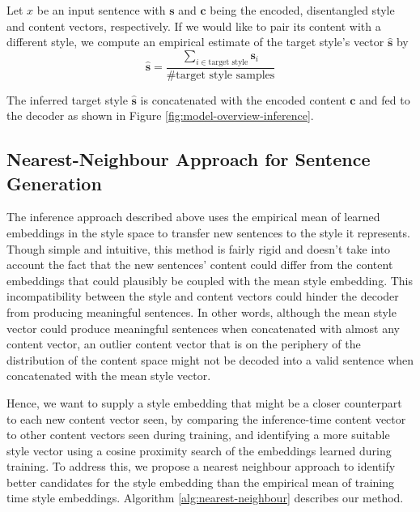 Let $x$ be an input sentence with $\bm s$ and $\bm c$ being the encoded, disentangled style and content vectors, respectively. If we would like to pair its content with a different style, we compute an empirical estimate of the target style's vector $\hat{\bm s}$ by
\begin{equation*}
	\hat{\bm s}=\frac{\sum_{i\in\text{target style}}\bm s_i}{\text{\# target style samples}}
\end{equation*}

The inferred target style $\hat{\bm s}$ is concatenated with the encoded content $\bm c$ and fed to the decoder as shown in Figure \ref{fig:model-overview-inference}.


\subsection{Nearest-Neighbour Approach for Sentence Generation} \label{ssec:nearest-neighbour-inference}

The inference approach described above uses the empirical mean of learned embeddings in the style space to transfer new sentences to the style it represents. Though simple and intuitive, this method is fairly rigid and doesn't take into account the fact that the new sentences' content could differ from the content embeddings that could plausibly be coupled with the mean style embedding. This incompatibility between the style and content vectors could hinder the decoder from producing meaningful sentences. In other words, although the mean style vector could produce meaningful sentences when concatenated with almost any content vector, an outlier content vector that is on the periphery of the distribution of the content space might not be decoded into a valid sentence when concatenated with the mean style vector.

Hence, we want to supply a style embedding that might be a closer counterpart to each new content vector seen, by comparing the inference-time content vector to other content vectors seen during training, and identifying a more suitable style vector using a cosine proximity search of the embeddings learned during training. To address this, we propose a nearest neighbour approach to identify better candidates for the style embedding than the empirical mean of training time style embeddings. Algorithm \ref{alg:nearest-neighbour} describes our method.

